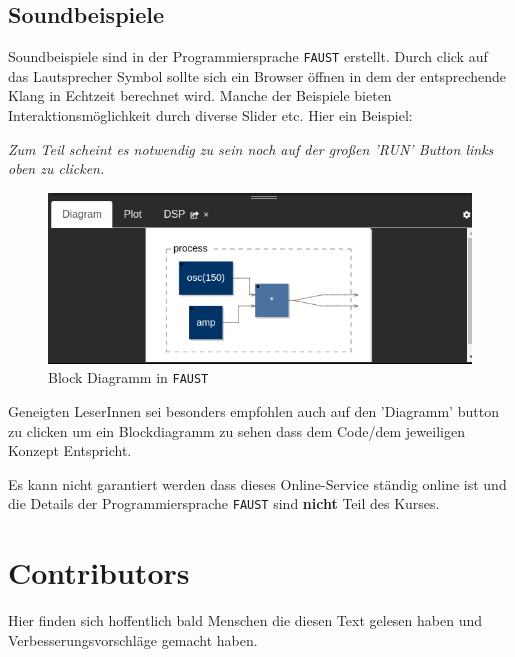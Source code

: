 \subsection*{Soundbeispiele}

Soundbeispiele sind in der Programmiersprache \texttt{FAUST} erstellt. Durch click auf das Lautsprecher Symbol sollte sich ein Browser öffnen in dem der entsprechende Klang in Echtzeit berechnet wird. Manche der Beispiele bieten Interaktionsmöglichkeit durch diverse Slider etc. Hier ein Beispiel:


\emph{Zum Teil scheint es notwendig zu sein noch auf der großen 'RUN' Button links oben zu clicken.}

\begin{figure}[h!]
	\centering
	\includegraphics[width=0.8 \textwidth]{img/faust_diag.png}
	\caption{Block Diagramm in \texttt{FAUST}}
	\label{fig:faustBlock}
\end{figure}

Geneigten LeserInnen sei besonders empfohlen auch auf den 'Diagramm' button zu clicken um ein Blockdiagramm zu sehen dass dem Code/dem jeweiligen Konzept Entspricht.

Es kann nicht garantiert werden dass dieses Online-Service ständig online ist und die Details der Programmiersprache \texttt{FAUST} sind \textbf{nicht} Teil des Kurses.

\section*{Contributors}
Hier finden sich hoffentlich bald Menschen die diesen Text gelesen haben und Verbesserungsvorschläge gemacht haben.

